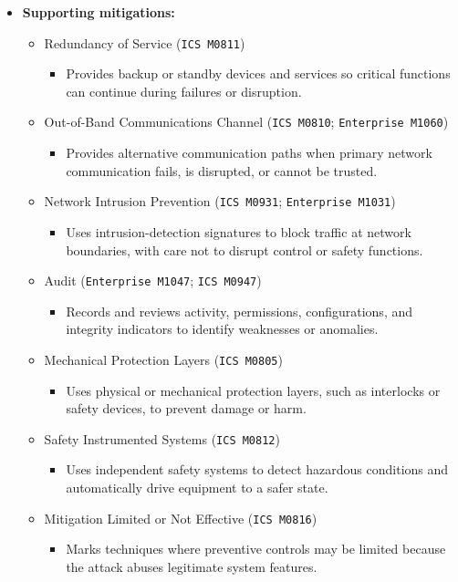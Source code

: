 \documentclass[10pt,a4paper,oneside]{report}
\begin{document}
\begin{itemize}
\item \textbf{Supporting mitigations:}
\begin{itemize}
\item Redundancy of Service (\texttt{ICS M0811})
\begin{itemize}
\item Provides backup or standby devices and services so critical functions can continue during failures or disruption.
\end{itemize}
\item Out-of-Band Communications Channel (\texttt{ICS M0810}; \texttt{Enterprise M1060})
\begin{itemize}
\item Provides alternative communication paths when primary network communication fails, is disrupted, or cannot be trusted.
\end{itemize}
\item Network Intrusion Prevention (\texttt{ICS M0931}; \texttt{Enterprise M1031})
\begin{itemize}
\item Uses intrusion-detection signatures to block traffic at network boundaries, with care not to disrupt control or safety functions.
\end{itemize}
\item Audit (\texttt{Enterprise M1047}; \texttt{ICS M0947})
\begin{itemize}
\item Records and reviews activity, permissions, configurations, and integrity indicators to identify weaknesses or anomalies.
\end{itemize}
\item Mechanical Protection Layers (\texttt{ICS M0805})
\begin{itemize}
\item Uses physical or mechanical protection layers, such as interlocks or safety devices, to prevent damage or harm.
\end{itemize}
\item Safety Instrumented Systems (\texttt{ICS M0812})
\begin{itemize}
\item Uses independent safety systems to detect hazardous conditions and automatically drive equipment to a safer state.
\end{itemize}
\item Mitigation Limited or Not Effective (\texttt{ICS M0816})
\begin{itemize}
\item Marks techniques where preventive controls may be limited because the attack abuses legitimate system features.
\end{itemize}
\end{itemize}
\end{itemize}
\end{document}
